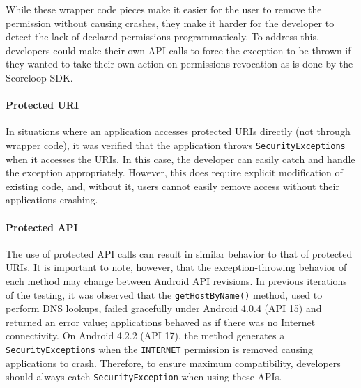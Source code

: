 While these wrapper code pieces make it easier for the user to remove the permission without causing crashes, they make it harder for the developer to detect the lack of declared permissions programmaticaly.  To address this, developers could make their own API calls to force the exception to be thrown if they wanted to take their own action on permissions revocation as is done by the Scoreloop SDK. 

\paragraph{\bfseries Protected URI}
In situations where an application accesses protected URIs directly (not through wrapper code), it was verified that the application throws \texttt{SecurityExceptions} when it accesses the URIs.  In this case, the developer can easily catch and handle the exception appropriately.  However, this does require explicit modification of existing code, and, without it, users cannot easily remove access without their applications crashing.  

\paragraph{\bfseries Protected API}
The use of protected API calls can result in similar behavior to that of protected URIs.  It is important to note, however, that the exception-throwing behavior of each method may change between Android API revisions.  In previous iterations of the testing, it was observed that the \texttt{getHostByName()} method, used to perform DNS lookups, failed gracefully under Android 4.0.4 (API 15) and returned an error value; applications behaved as if there was no Internet connectivity.  On Android 4.2.2 (API 17), the method generates a \texttt{SecurityExceptions} when the \texttt{INTERNET} permission is removed causing applications to crash.  Therefore, to ensure maximum compatibility, developers should always catch \texttt{SecurityException} when using these APIs.


